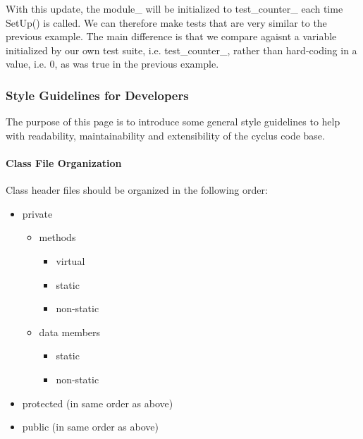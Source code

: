 \documentclass[letterpaper,10pt,english]{sphinxmanual}
\begin{document}
With this update, the module\_ will be initialized to test\_counter\_
each time SetUp() is called. We can therefore make tests that are
very similar to the previous example. The main difference is that we
compare agaisnt a variable initialized by our own test suite, i.e.
test\_counter\_, rather than hard-coding in a value, i.e. 0, as was
true in the previous example.


\subsubsection{Style Guidelines for Developers}
\label{devdoc/style_guide:style-guidelines-for-developers}\label{devdoc/style_guide::doc}
The purpose of this page is to introduce some general style guidelines to help
with readability, maintainability and extensibility of the cyclus code base.


\paragraph{Class File Organization}
\label{devdoc/style_guide:class-file-organization}
Class header files should be organized in the following order:
\begin{itemize}
\item {} 
private
\begin{itemize}
\item {} 
methods
\begin{itemize}
\item {} 
virtual

\item {} 
static

\item {} 
non-static

\end{itemize}

\item {} 
data members
\begin{itemize}
\item {} 
static

\item {} 
non-static

\end{itemize}

\end{itemize}

\item {} 
protected (in same order as above)

\item {} 
public (in same order as above)

\end{itemize}
\end{document}
